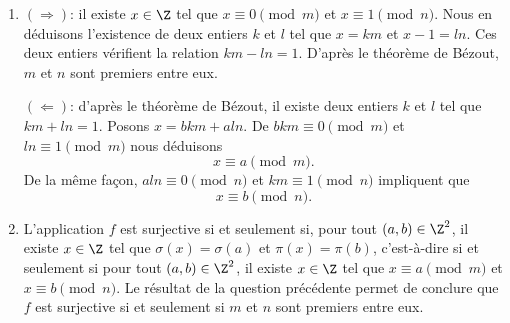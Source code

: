 \begin{enumerate}
  \item 
    $(\Rightarrow)$: il existe $x\in\Z$ tel que $x\equiv 0\pmod{m}$ et 
    $x\equiv 1\pmod{n}$. Nous en déduisons l'existence de deux entiers $k$ et
    $l$ tel que $x = km$ et $x - 1 = ln$. Ces deux entiers vérifient la relation
    $km - ln = 1$. D'après le théorème de Bézout, $m$ et $n$ sont premiers entre
    eux.

    $(\Leftarrow)$: d'après le théorème de Bézout, il existe deux entiers $k$ et
    $l$ tel que $km + ln = 1$. Posons $x = bkm + aln$. 
    De $bkm \equiv 0 \pmod{m}$ et $ln \equiv 1\pmod{m}$ nous déduisons
    \[
      x\equiv a\pmod{m}.
    \]
    De la même façon, $aln \equiv 0 \pmod{n}$ et $km\equiv 1\pmod{n}$ impliquent
    que
    \[
      x\equiv b\pmod{n}.
    \]

  \item
    L'application $f$ est surjective si et seulement si, pour tout
    $(a,b)\in\Z^2$, il existe $x\in\Z$ tel que 
    $\sigma(x)=\sigma(a)$ et $\pi(x)=\pi(b)$, c'est-à-dire si et seulement si pour
    tout $(a,b)\in\Z^2$, il existe $x\in\Z$ tel que $x\equiv a\pmod{m}$ et
    $x\equiv b\pmod{n}$. Le résultat de la question précédente permet de
    conclure que $f$ est surjective si et seulement si $m$ et $n$ sont premiers
    entre eux.
\end{enumerate}
